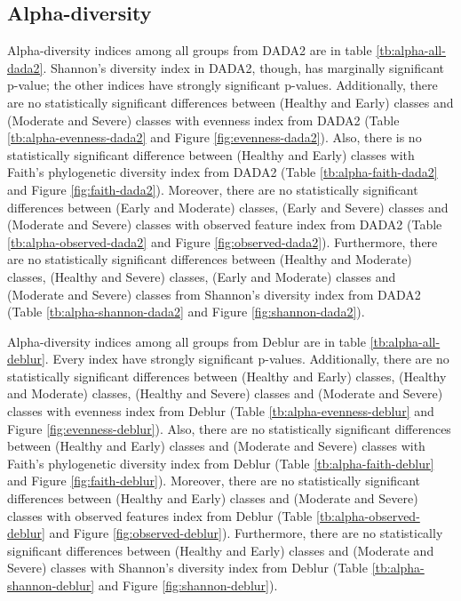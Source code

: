 \documentclass[a4paper]{article}
\begin{document}
        \subsection{Alpha-diversity}
            Alpha-diversity indices among all groups from DADA2 are in table \ref{tb:alpha-all-dada2}. Shannon's diversity index in DADA2, though, has marginally significant p-value; the other indices have strongly significant p-values. Additionally, there are no statistically significant differences between (Healthy and Early) classes and (Moderate and Severe) classes with evenness index from DADA2 (Table \ref{tb:alpha-evenness-dada2} and Figure \ref{fig:evenness-dada2}). Also, there is no statistically significant difference between (Healthy and Early) classes with Faith's phylogenetic diversity index from DADA2 (Table \ref{tb:alpha-faith-dada2} and Figure \ref{fig:faith-dada2}). Moreover, there are no statistically significant differences between (Early and Moderate) classes, (Early and Severe) classes and (Moderate and Severe) classes with observed feature index from DADA2 (Table \ref{tb:alpha-observed-dada2} and Figure \ref{fig:observed-dada2}). Furthermore, there are no statistically significant differences between (Healthy and Moderate) classes, (Healthy and Severe) classes, (Early and Moderate) classes and (Moderate and Severe) classes from Shannon's diversity index from DADA2 (Table \ref{tb:alpha-shannon-dada2} and Figure \ref{fig:shannon-dada2}).

            Alpha-diversity indices among all groups from Deblur are in table \ref{tb:alpha-all-deblur}. Every index have strongly significant p-values. Additionally, there are no statistically significant differences between (Healthy and Early) classes, (Healthy and Moderate) classes, (Healthy and Severe) classes and (Moderate and Severe) classes with evenness index from Deblur (Table \ref{tb:alpha-evenness-deblur} and Figure \ref{fig:evenness-deblur}). Also, there are no statistically significant differences between (Healthy and Early) classes and (Moderate and Severe) classes with Faith's phylogenetic diversity index from Deblur (Table \ref{tb:alpha-faith-deblur} and Figure \ref{fig:faith-deblur}). Moreover, there are no statistically significant differences between (Healthy and Early) classes and (Moderate and Severe) classes with observed features index from Deblur (Table \ref{tb:alpha-observed-deblur} and Figure \ref{fig:observed-deblur}). Furthermore, there are no statistically significant differences between (Healthy and Early) classes and (Moderate and Severe) classes with Shannon's diversity index from Deblur (Table \ref{tb:alpha-shannon-deblur} and Figure \ref{fig:shannon-deblur}).
\end{document}
